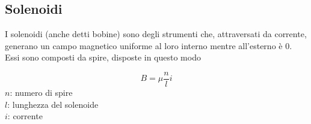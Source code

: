 \subsection{Solenoidi}
I solenoidi (anche detti bobine) sono degli strumenti che, attraversati da corrente, generano un
campo magnetico uniforme al loro interno mentre all'esterno è $0$. Essi sono composti da spire,
disposte in questo modo
\begin{center} %
\end{center}
\begin{equation*}
  B = \mu \frac{n}{l}i
\end{equation*}
$n$: numero di spire\\
$l$: lunghezza del solenoide\\
$i$: corrente


